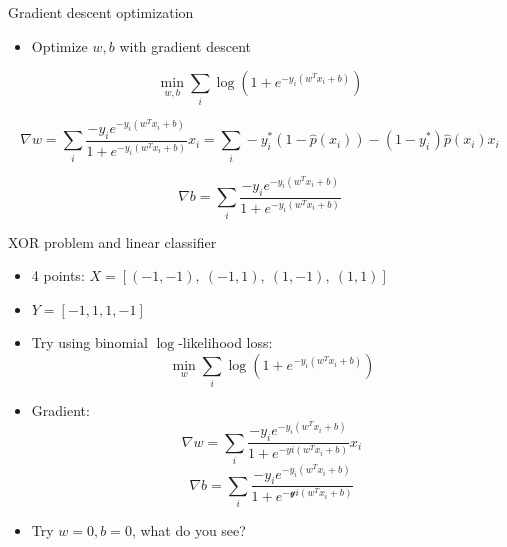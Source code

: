 \documentclass[12pt,notes,mathserif]{beamer}
\providecommand{\tightlist}{%
	\setlength{\itemsep}{0pt}\setlength{\parskip}{0pt}}
\begin{document}
\begin{frame}{Gradient descent optimization}

\begin{itemize}
\tightlist
\item
  Optimize \(w, b\) with gradient descent
\end{itemize}

\[\min_{w,b}\sum_{i}\log(1+e^{-y_{i}(w^{{T}}x_{i}+b)})\]

\[\nabla w=\sum_{i}\frac{-{y}_{i}e^{-y_{i}(w^{{T}}x_{i}+b)}}{1+e^{-y_{i}(w^{{T}}x_{i}+b)}}x_{i}=\sum_{i}-{y}_{i}^{*}(1-\hat{p}(x_{i}))-(1-{y}_{i}^{*})\hat{p}(x_{i})x_{i}\]

\[\nabla b=\sum_{i}\frac{-{y}_{i}e^{-y_{i}(w^{{T}}x_{i}+b)}}{1+e^{-y_{i}(w^{{T}}x_{i}+b)}}\]

\end{frame}

\begin{frame}{XOR problem and linear classifier}

\begin{itemize}
\item
  4 points: \({X}=[(-1,-1),\ (-1,1),\ (1,-1),\ (1,1)]\)
\item
  \(Y=[-1, 1, 1, -1]\)
\item
  Try using binomial \(\log\)-likelihood loss: \[
  \min_{w}\sum_{i}\log(1+e^{-y_{i}(w^{{T}}x_{i}+ b)})
  \]
\item
  Gradient:
  \[\nabla w=\sum_{i}\frac{-{y}_{i}e^{-y_{i}(w^{{T}}x_{i}+b)}}{1+e^{-{y}i(w^{{T}}x_{i}+b)}}x_{i}\]
  \[\nabla b=\sum_{i}\frac{-{y}_{i}e^{-y_{i}(w^{{T}}x_{i}+b)}}{1+e^{-\mathcal{y}i(w^{{T}}x_{i}+b)}}\]
\item
  Try \(w=0, b=0\), what do you see?
\end{itemize}

\end{frame}
\end{document}

